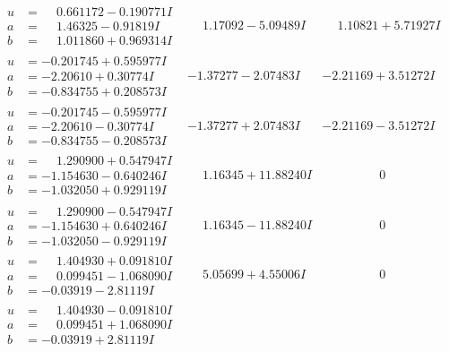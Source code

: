 \documentclass[1p]{elsarticle_modified}
\theoremstyle{definition}
\begin{document}
$$\begin{array}{c|c|c}
\begin{aligned}
u &= \phantom{-}0.661172 - 0.190771 I \\
a &= \phantom{-}1.46325 - 0.91819 I \\
b &= \phantom{-}1.011860 + 0.969314 I\end{aligned}
 & \phantom{-}1.17092 - 5.09489 I & \phantom{-}1.10821 + 5.71927 I \\ \hline\begin{aligned}
u &= -0.201745 + 0.595977 I \\
a &= -2.20610 + 0.30774 I \\
b &= -0.834755 + 0.208573 I\end{aligned}
 & -1.37277 - 2.07483 I & -2.21169 + 3.51272 I \\ \hline\begin{aligned}
u &= -0.201745 - 0.595977 I \\
a &= -2.20610 - 0.30774 I \\
b &= -0.834755 - 0.208573 I\end{aligned}
 & -1.37277 + 2.07483 I & -2.21169 - 3.51272 I \\ \hline\begin{aligned}
u &= \phantom{-}1.290900 + 0.547947 I \\
a &= -1.154630 - 0.640246 I \\
b &= -1.032050 + 0.929119 I\end{aligned}
 & \phantom{-}1.16345 + 11.88240 I & \phantom{-0.000000 } 0 \\ \hline\begin{aligned}
u &= \phantom{-}1.290900 - 0.547947 I \\
a &= -1.154630 + 0.640246 I \\
b &= -1.032050 - 0.929119 I\end{aligned}
 & \phantom{-}1.16345 - 11.88240 I & \phantom{-0.000000 } 0 \\ \hline\begin{aligned}
u &= \phantom{-}1.404930 + 0.091810 I \\
a &= \phantom{-}0.099451 - 1.068090 I \\
b &= -0.03919 - 2.81119 I\end{aligned}
 & \phantom{-}5.05699 + 4.55006 I & \phantom{-0.000000 } 0 \\ \hline\begin{aligned}
u &= \phantom{-}1.404930 - 0.091810 I \\
a &= \phantom{-}0.099451 + 1.068090 I \\
b &= -0.03919 + 2.81119 I\end{aligned}

\end{array}$$
\end{document}

